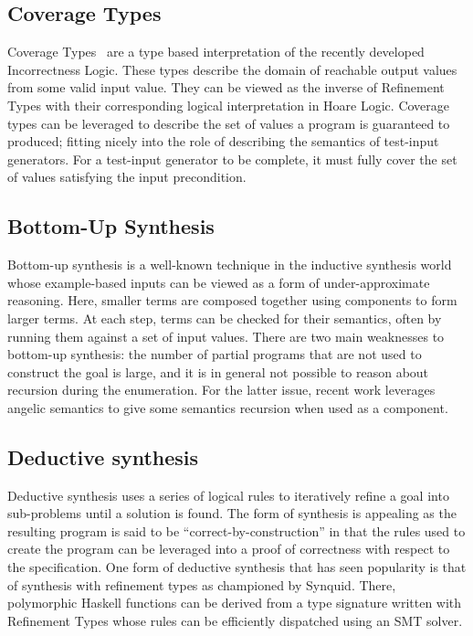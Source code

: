 \documentclass[review, sigplan]{acmart}
\begin{document}
\subsection{Coverage Types}

Coverage Types~\cite{Poirot} are a type based interpretation of the recently developed Incorrectness Logic\citep{IL}.
These types describe the domain of reachable output values from some valid input value.
They can be viewed as the inverse of Refinement Types with their corresponding logical interpretation in Hoare Logic.
Coverage types can be leveraged to describe the set of values a program is
guaranteed to produced; fitting nicely into the role of describing the semantics
of test-input generators. For a test-input generator to be complete, it must
fully cover the set of values satisfying the input precondition.

\subsection{Bottom-Up Synthesis}
Bottom-up synthesis is a well-known technique in the inductive synthesis world
whose example-based inputs can be viewed as a form of under-approximate
reasoning. Here, smaller terms are composed together using components to form
larger terms. At each step, terms can be checked for their semantics, often by
running them against a set of input values. There are two main weaknesses to
bottom-up synthesis: the number of partial programs that are not used to
construct the goal is large, and it is in general not possible to reason about
recursion during the enumeration. For the latter issue, recent work leverages
angelic semantics to give some semantics recursion when used as a component\cite{Burst}.

\subsection{Deductive synthesis}
Deductive synthesis uses a series of logical rules to iteratively refine a goal
into sub-problems until a solution is found. The form of synthesis is appealing
as the resulting program is said to be ``correct-by-construction'' in that the
rules used to create the program can be leveraged into a proof of correctness
with respect to the specification. One form of deductive synthesis that has seen
popularity is that of synthesis with refinement types as championed by
Synquid\cite{Synquid}. There, polymorphic Haskell functions can be derived from
a type signature written with Refinement Types\cite{Refinement} whose rules can
be efficiently dispatched using an SMT solver.
\end{document}
